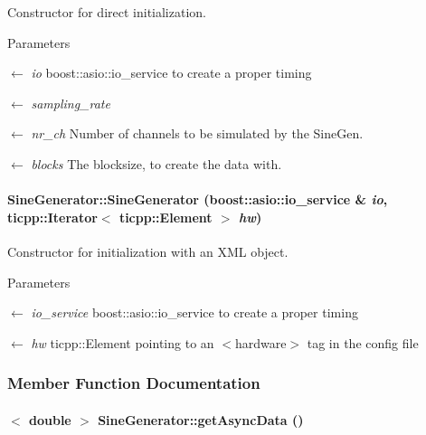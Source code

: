 Constructor for direct initialization. 
\begin{DoxyParams}{Parameters}
\item[\mbox{$\leftarrow$} {\em io}]boost::asio::io\_\-service to create a proper timing \item[\mbox{$\leftarrow$} {\em sampling\_\-rate}]\item[\mbox{$\leftarrow$} {\em nr\_\-ch}]Number of channels to be simulated by the SineGen. \item[\mbox{$\leftarrow$} {\em blocks}]The blocksize, to create the data with. \end{DoxyParams}
\hypertarget{class_sine_generator_a42bff2f5cd6f4e08d94e9b9191cb9a3d}{
\paragraph[{SineGenerator}]{\setlength{\rightskip}{0pt plus 5cm}SineGenerator::SineGenerator (boost::asio::io\_\-service \& {\em io}, \/  ticpp::Iterator$<$ ticpp::Element $>$ {\em hw})}\hfill}
\label{class_sine_generator_a42bff2f5cd6f4e08d94e9b9191cb9a3d}


Constructor for initialization with an XML object. 
\begin{DoxyParams}{Parameters}
\item[\mbox{$\leftarrow$} {\em io\_\-service}]boost::asio::io\_\-service to create a proper timing \item[\mbox{$\leftarrow$} {\em hw}]ticpp::Element pointing to an $<$hardware$>$ tag in the config file \end{DoxyParams}


\subsubsection{Member Function Documentation}
\hypertarget{class_sine_generator_ad609b16d89e1d1c762cd94023ea41439}{
\paragraph[{getAsyncData}]{$<$ double $>$ SineGenerator::getAsyncData ()}\hfill}
\label{class_sine_generator_ad609b16d89e1d1c762cd94023ea41439}


